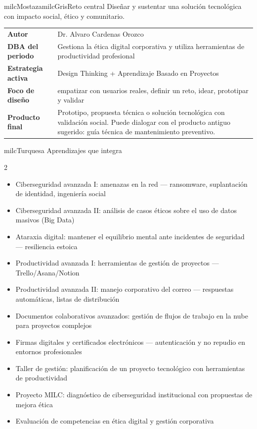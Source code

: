 \documentclass[11pt,letterpaper]{article}
\begin{document}
\begin{softbox}{milcMostaza}{milcGris}{Reto central}
Diseñar y sustentar una solución tecnológica con impacto social, ético y comunitario.
\end{softbox}

\begin{tabularx}{\textwidth}{>{\bfseries}p{3.4cm}X}
\rowcolor{milcMagenta!12}Autor & Dr. Alvaro Cardenas Orozco\\
DBA del periodo & Gestiona la ética digital corporativa y utiliza herramientas de productividad profesional\\
Estrategia activa & Design Thinking + Aprendizaje Basado en Proyectos\\
Foco de diseño & empatizar con usuarios reales, definir un reto, idear, prototipar y validar\\
Producto final & Prototipo, propuesta técnica o solución tecnológica con validación social. Puede dialogar con el producto antiguo sugerido: guía técnica de mantenimiento preventivo.\\
\end{tabularx}

\begin{titlebox}{milcTurquesa}
Aprendizajes que integra
\end{titlebox}
\begin{multicols}{2}
\begin{itemize}[leftmargin=*]
\item Ciberseguridad avanzada I: amenazas en la red — ransomware, suplantación de identidad, ingeniería social
\item Ciberseguridad avanzada II: análisis de casos éticos sobre el uso de datos masivos (Big Data)
\item Ataraxia digital: mantener el equilibrio mental ante incidentes de seguridad — resiliencia estoica
\item Productividad avanzada I: herramientas de gestión de proyectos — Trello/Asana/Notion
\item Productividad avanzada II: manejo corporativo del correo — respuestas automáticas, listas de distribución
\item Documentos colaborativos avanzados: gestión de flujos de trabajo en la nube para proyectos complejos
\item Firmas digitales y certificados electrónicos — autenticación y no repudio en entornos profesionales
\item Taller de gestión: planificación de un proyecto tecnológico con herramientas de productividad
\item Proyecto MILC: diagnóstico de ciberseguridad institucional con propuestas de mejora ética
\item Evaluación de competencias en ética digital y gestión corporativa
\end{itemize}
\end{multicols}
\end{document}
